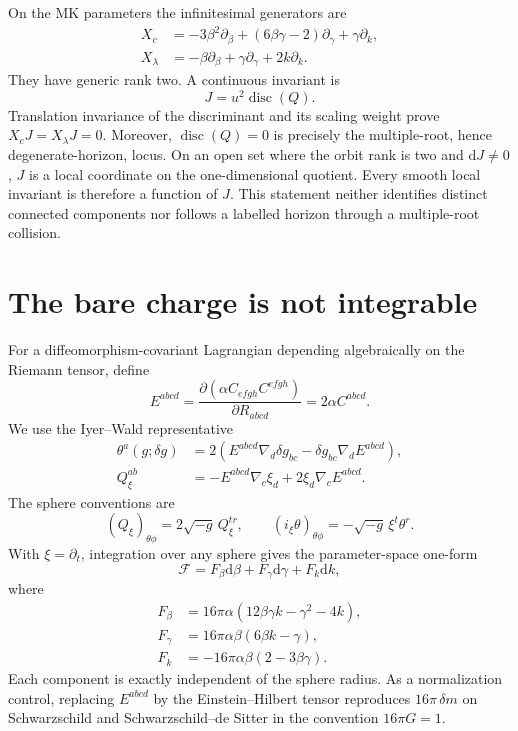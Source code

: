 \documentclass[11pt]{article}
\theoremstyle{definition}
\theoremstyle{remark}
\newcommand{\dd}{\mathrm d}
\begin{document}
On the MK parameters the infinitesimal generators are
\begin{align}
 X_c&=-3\beta^2\partial_\beta
 +(6\beta\gamma-2)\partial_\gamma+\gamma\partial_k,
\label{eq:Xc}\\
 X_\lambda&=-\beta\partial_\beta
 +\gamma\partial_\gamma+2k\partial_k.
\label{eq:Xl}
\end{align}
They have generic rank two.  A continuous invariant is
\begin{equation}\label{eq:J}
 J=u^2\operatorname{disc}(Q).
\end{equation}
Translation invariance of the discriminant and its scaling weight prove
\(X_cJ=X_\lambda J=0\).  Moreover,
\(\operatorname{disc}(Q)=0\) is precisely the multiple-root, hence
degenerate-horizon, locus.  On an open set where the orbit rank is two and
\(\dd J\neq0\), \(J\) is a local coordinate on the one-dimensional
quotient.  Every smooth local invariant is therefore a function of \(J\).
This statement neither identifies distinct connected components nor
follows a labelled horizon through a multiple-root collision.

\section{The bare charge is not integrable}

For a diffeomorphism-covariant Lagrangian depending algebraically on the
Riemann tensor, define
\[
 E^{abcd}=\frac{\partial(\alpha C_{efgh}C^{efgh})}
                 {\partial R_{abcd}}
          =2\alpha C^{abcd}.
\]
We use the Iyer--Wald representative \cite{LeeWald,IyerWald}
\begin{align}
 \theta^a(g;\delta g)
 &=2\left(E^{abcd}\nabla_d\delta g_{bc}
          -\delta g_{bc}\nabla_dE^{abcd}\right),\\
 Q^{ab}_\xi
 &=-E^{abcd}\nabla_c\xi_d+2\xi_d\nabla_cE^{abcd}.
\end{align}
The sphere conventions are
\[
 (Q_\xi)_{\theta\phi}=2\sqrt{-g}\,Q^{tr}_\xi,\qquad
 (i_\xi\theta)_{\theta\phi}=-\sqrt{-g}\,\xi^t\theta^r.
\]
With \(\xi=\partial_t\), integration over any sphere gives the
parameter-space one-form
\begin{equation}\label{eq:F}
 \mathcal F=F_\beta\dd\beta+F_\gamma\dd\gamma+F_k\dd k,
\end{equation}
where
\begin{align}
 F_\beta&=16\pi\alpha(12\beta\gamma k-\gamma^2-4k),\nonumber\\
 F_\gamma&=16\pi\alpha\beta(6\beta k-\gamma),\label{eq:Fcomponents}\\
 F_k&=-16\pi\alpha\beta(2-3\beta\gamma).\nonumber
\end{align}
Each component is exactly independent of the sphere radius.  As a
normalization control, replacing \(E^{abcd}\) by the Einstein--Hilbert
tensor reproduces \(16\pi\,\delta m\) on Schwarzschild and
Schwarzschild--de Sitter in the convention \(16\pi G=1\).
\end{document}
